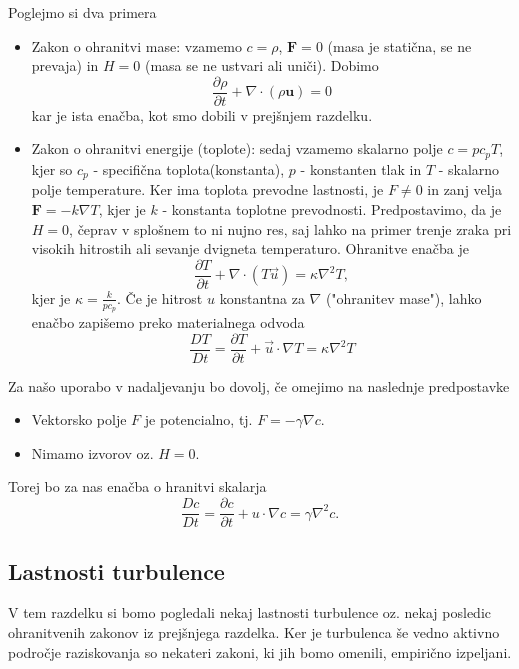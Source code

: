 \documentclass[mat2, tisk]{fmfdelo}
\newcommand{\bd}{\textbf}
\begin{document}
Poglejmo si dva primera
\begin{primer}
  \hfil
\begin{itemize}
  \item Zakon o ohranitvi mase: vzamemo $c = \rho$, $\bd{F} = 0$ (masa je statična, se ne prevaja) in 
  $H = 0$ (masa se ne ustvari ali uniči). Dobimo
  $$
  \frac{\partial \rho}{\partial t} + \nabla \cdot (\rho \bd{u}) = 0
  $$
  kar je ista enačba, kot smo dobili v prejšnjem razdelku.
  \item Zakon o ohranitvi energije (toplote): sedaj vzamemo skalarno polje $c = pc_p T$, kjer 
  so $c_p$ - specifična toplota(konstanta), $p$ - konstanten tlak in $T$ - skalarno polje temperature. 
  Ker ima toplota prevodne lastnosti, je $F \neq 0$ in zanj velja $\bd{F} = -k\nabla T$, kjer je 
  $k$ - konstanta toplotne prevodnosti. Predpostavimo, da je $H = 0$, čeprav v splošnem to 
  ni nujno res, saj lahko na primer trenje zraka pri visokih hitrostih ali sevanje 
  dvigneta temperaturo. Ohranitve enačba je 
  \begin{equation}
  \frac{\partial T}{\partial t} + \nabla \cdot (T \vec{u}) = \kappa \nabla^2 T,
  \end{equation}
  kjer je $\kappa = \frac{k}{p c_p}$.
  Če je hitrost $u$ konstantna za $\nabla$ ("ohranitev mase"), lahko enačbo zapišemo preko materialnega odvoda
  \begin{equation}
  \frac{D T}{D t} = \frac{\partial T}{\partial t} + \vec{u}\cdot\nabla T = \kappa \nabla^2 T
  \end{equation}
\end{itemize}
\end{primer}
Za našo uporabo v nadaljevanju bo dovolj, če omejimo na naslednje predpostavke
\begin{itemize}
  \item Vektorsko polje $F$ je potencialno, tj. $F = - \gamma \nabla c$. 
  \item Nimamo izvorov oz. $H = 0$.
\end{itemize}
Torej bo za nas enačba o hranitvi skalarja 
\begin{equation}
\frac{D c}{D t} = \frac{\partial c}{\partial t} + u\cdot\nabla c = \gamma \nabla^2 c.
\end{equation}

\subsection{Lastnosti turbulence}
V tem razdelku si bomo pogledali nekaj lastnosti turbulence oz. nekaj posledic 
ohranitvenih zakonov iz prejšnjega razdelka. Ker je turbulenca še vedno aktivno
področje raziskovanja so nekateri zakoni, ki jih bomo omenili, empirično izpeljani.
\end{document}
